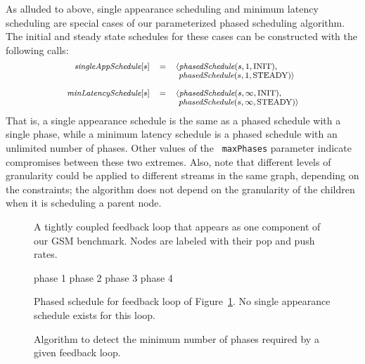 As alluded to above, single appearance scheduling and minimum latency
scheduling are special cases of our parameterized phased scheduling
algorithm.  The initial and steady state schedules for these cases can
be constructed with the following calls:
\[
\small
\begin{array}{rcl}
\mt{singleAppSchedule}[s]  & = & \langle \mt{phasedSchedule}(s, 1, \mbox{INIT}), \\
                         ~ & ~ & ~ \mt{phasedSchedule}(s, 1, \mbox{STEADY}) \rangle \\ ~ \\
\mt{minLatencySchedule}[s] & = & \langle \mt{phasedSchedule}(s, \infty, \mbox{INIT}), \\
                         ~ & ~ & ~ \mt{phasedSchedule}(s, \infty, \mbox{STEADY}) \rangle
\end{array}
\]
That is, a single appearance schedule is the same as a phased schedule
with a single phase, while a minimum latency schedule is a phased
schedule with an unlimited number of phases.  Other values of the {\tt
maxPhases} parameter indicate compromises between these two extremes.
Also, note that different levels of granularity could be applied to
different streams in the same graph, depending on the constraints; the
algorithm does not depend on the granularity of the children when it
is scheduling a parent node.

\begin{figure}[t]
\begin{center}
\caption{\small A tightly coupled feedback loop that appears as one component
of our GSM benchmark.  Nodes are labeled with their pop and push
rates.  \protect\label{fig:gsm}}
\end{center}
\end{figure}

\begin{figure*}[t]

\hspace{43pt} 
phase 1 \hspace{94pt}
phase 2 \hspace{94pt}
phase 3 \hspace{94pt}
phase 4
\caption{\small Phased schedule for feedback loop of Figure~\ref{fig:gsm}.
No single appearance schedule exists for this
loop.\protect\label{fig:gsm-phases}}
\end{figure*}

\begin{figure}[t]
\vspace{-6pt}
\caption{\small Algorithm to detect the minimum number of phases required by
a given feedback loop.\protect\label{fig:feedalg}}
\end{figure}

